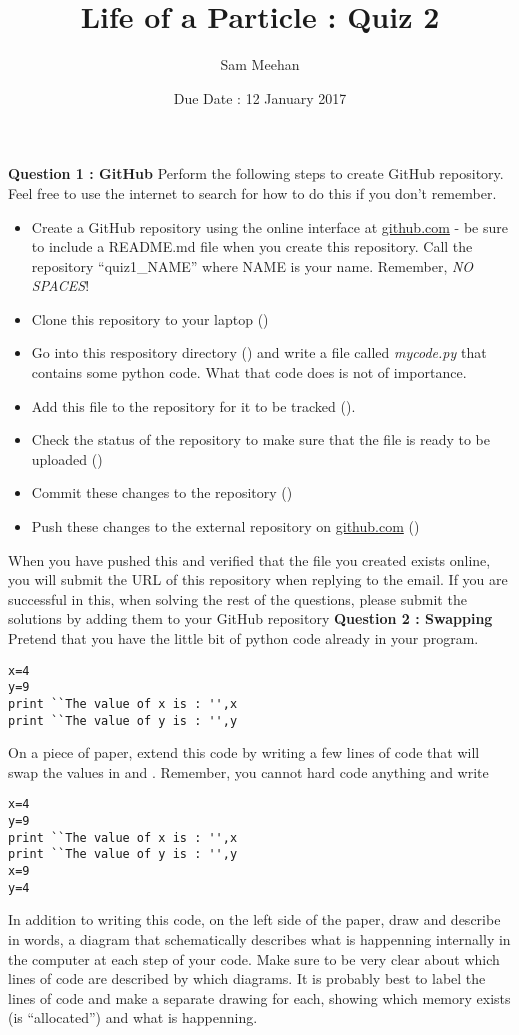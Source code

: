 \documentclass[12pt]{article}
\title{Life of a Particle : Quiz 2}
\author{Sam Meehan}
\date{Due Date : 12 January 2017}
\begin{document}
\maketitle

\textbf{Question 1 : GitHub}
Perform the following steps to create GitHub repository.  Feel free to use the internet to search for how to do this if you don't remember.
\begin{itemize}[noitemsep]
\item Create a GitHub repository using the online interface at \href{https://github.com}{github.com} - be sure to include a README.md file when you create this repository.  Call the repository ``quiz1\_NAME'' where NAME is your name.  Remember, \textit{NO SPACES}!
\item Clone this repository to your laptop (\small{})
\item Go into this respository directory (\small{}) and write a file called \textit{mycode.py} that contains some python code.  What that code does is not of importance.
\item Add this file to the repository for it to be tracked (\small{}).
\item Check the status of the repository to make sure that the file is ready to be uploaded (\small{})
\item Commit these changes to the repository (\small{})
\item Push these changes to the external repository on \href{https://github.com}{github.com} (\small{})
\end{itemize}
When you have pushed this and verified that the file you created exists online, you will submit the URL of this repository when replying to the email.  If you are successful in this, when solving the rest of the questions, please submit the solutions by adding them to your GitHub repository 
\newline
\newline
\textbf{Question 2 : Swapping}
Pretend that you have the little bit of python code already in your program.
\begin{lstlisting}
x=4
y=9
print ``The value of x is : '',x
print ``The value of y is : '',y
\end{lstlisting}
On a piece of paper, extend this code by writing a few lines of code that will swap the values in \small{} and \small{}.  Remember, you cannot hard code anything and write
\begin{lstlisting}
x=4
y=9
print ``The value of x is : '',x
print ``The value of y is : '',y
x=9
y=4
\end{lstlisting}
In addition to writing this code, on the left side of the paper, draw and describe in words, a diagram that schematically describes what is happenning internally in the computer at each step of your code.  Make sure to be very clear about which lines of code are described by which diagrams.  It is probably best to label the lines of code and make a separate drawing for each, showing which memory exists (is ``allocated'') and what is happenning.
\end{document}
